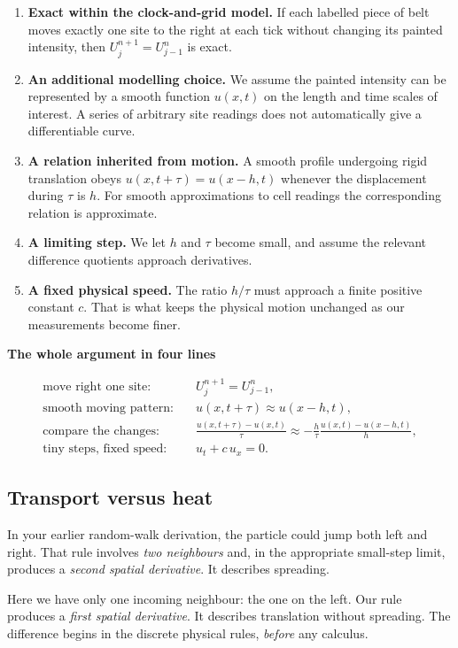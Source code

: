 \documentclass[11pt,a4paper]{article}
\newcommand{\substart}[1]{\Needspace{5\baselineskip}\subsection{#1}}
\begin{document}
\begin{enumerate}
\item \textbf{Exact within the clock-and-grid model.} If each labelled piece of belt moves exactly one site to the right at each tick without changing its painted intensity, then $U_j^{n+1}=U_{j-1}^n$ is exact.
\item \textbf{An additional modelling choice.} We assume the painted intensity can be represented by a smooth function $u(x,t)$ on the length and time scales of interest. A series of arbitrary site readings does not automatically give a differentiable curve.
\item \textbf{A relation inherited from motion.} A smooth profile undergoing rigid translation obeys $u(x,t+\tau)=u(x-h,t)$ whenever the displacement during $\tau$ is $h$. For smooth approximations to cell readings the corresponding relation is approximate.
\item \textbf{A limiting step.} We let $h$ and $\tau$ become small, and assume the relevant difference quotients approach derivatives.
\item \textbf{A fixed physical speed.} The ratio $h/\tau$ must approach a finite positive constant $c$. That is what keeps the physical motion unchanged as our measurements become finer.
\end{enumerate}
\begin{pointbox}
\textbf{The whole argument in four lines}\par\smallskip
\begin{align*}
\text{move right one site:}\quad &U_j^{n+1}=U_{j-1}^n,\\[2pt]
\text{smooth moving pattern:}\quad &u(x,t+\tau)\approx u(x-h,t),\\[2pt]
\text{compare the changes:}\quad &\frac{u(x,t+\tau)-u(x,t)}{\tau}
\approx-\frac{h}{\tau}\frac{u(x,t)-u(x-h,t)}{h},\\[2pt]
\text{tiny steps, fixed speed:}\quad &\boxed{u_t+c\,u_x=0.}
\end{align*}
\end{pointbox}
\substart{Transport versus heat}
In your earlier random-walk derivation, the particle could jump both left and right. That rule involves \emph{two neighbours} and, in the appropriate small-step limit, produces a \emph{second spatial derivative}. It describes spreading.

Here we have only one incoming neighbour: the one on the left. Our rule produces a \emph{first spatial derivative}. It describes translation without spreading. The difference begins in the discrete physical rules, \emph{before} any calculus.
\end{document}
